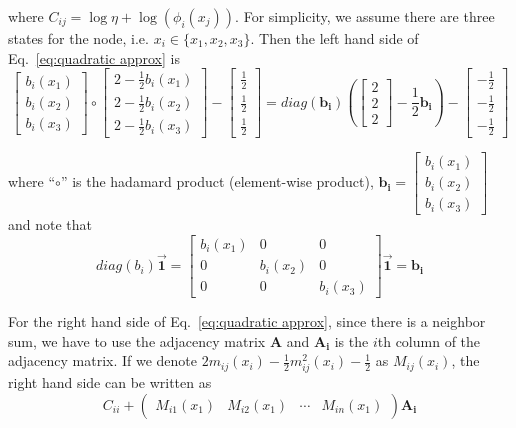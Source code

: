 where $C_{ij}=\log\eta + \log(\phi_i(x_j))$. For simplicity, we assume there are three states for the node, i.e. $x_i\in \{x_1, x_2, x_3\}$. Then the left hand side of Eq.~\ref{eq:quadratic approx} is
\begin{equation}
\left[ \begin{array}{c}
b_i(x_1) \\
b_i(x_2) \\
b_i(x_3) \end{array} \right] 
\circ
\left[ \begin{array}{c}
2-\frac{1}{2}b_i(x_1) \\
2-\frac{1}{2}b_i(x_2)\\
2-\frac{1}{2}b_i(x_3)\end{array} \right]
-
\left[ \begin{array}{c}
\frac{1}{2} \\
\frac{1}{2} \\
\frac{1}{2} \end{array} \right]
=
diag(\mathbf{b_i})(
\left[ \begin{array}{c}
2\\
2\\
2\end{array} \right]
-\frac{1}{2}\mathbf{b_i})
-
\left[ \begin{array}{c}
-\frac{1}{2} \\
-\frac{1}{2} \\
-\frac{1}{2} \end{array} \right]
\end{equation}

where ``$\circ$'' is the hadamard product (element-wise product), $\mathbf{b_i}=\left[ \begin{array}{c}
b_i(x_1) \\
b_i(x_2) \\
b_i(x_3) \end{array} \right] $ and note that 
\begin{equation}
diag(b_i) \mathbf{\vec{1}}= \left[ \begin{array}{ccc}
b_i(x_1)&0&0 \\
0&b_i(x_2)&0 \\
0&0&b_i(x_3) \end{array} \right] \mathbf{\vec{1}}= \mathbf{b_i}
\end{equation}

For the right hand side of Eq.~\ref{eq:quadratic approx}, since there is a neighbor sum, we have to use the adjacency matrix $\mathbf{A}$ and $\mathbf{A_i}$ is the $i$th column of the adjacency matrix. If we denote $2m_{ij}(x_i)-\frac{1}{2}m_{ij}^2(x_i)-\frac{1}{2}$ as $M_{ij}(x_i)$, the right hand side can be written as
\begin{equation}
C_{ii} + \left( \begin{array}{cccc}
M_{i1}(x_1)&M_{i2}(x_1)&\cdots& M_{in}(x_1)\end{array} \right)\mathbf{A_i}
\end{equation}

